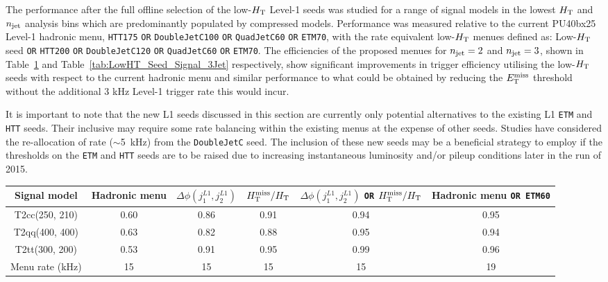 The performance after the full offline selection of the low-$\mbox{$H_\text{T}$}$ Level-1 seeds was studied for a range of signal models in the lowest $\mbox{$H_\text{T}$}$ and $n_{\text{jet}}$ analysis bins which are predominantly populated by compressed models. Performance was measured relative to the current PU40bx25 Level-1 hadronic menu, {\verb!HTT175! \verb!OR! \verb!DoubleJetC100! \verb!OR! \verb!QuadJetC60! \verb!OR! \verb!ETM70!}, with the rate equivalent low-$\mbox{$H_\text{T}$}$ menues defined as: Low-$\mbox{$H_\text{T}$}$ seed {\verb!OR! \verb!HTT200! \verb!OR! \verb!DoubleJetC120! \verb!OR! \verb!QuadJetC60! \verb!OR! \verb!ETM70!}. The efficiencies of the proposed menues for $n_{\text{jet}} = 2$ and $n_{\text{jet}} = 3$, shown in Table~\ref{tab:LowHT_Seed_Signal_2Jet} and Table~\ref{tab:LowHT_Seed_Signal_3Jet} respectively, show significant improvements in trigger efficiency utilising the low-$\mbox{$H_\text{T}$}$ seeds with respect to the current hadronic menu and similar performance to what could be obtained by reducing the $\mbox{$E_\text{T}^{\rm miss}$}$ threshold without the additional 3 kHz Level-1 trigger rate this would incur.

It is important to note that the new L1 seeds discussed in this
section are currently only potential alternatives to the existing L1
\texttt{ETM} and \texttt{HTT} seeds. Their inclusive may require some
rate balancing within the existing menus at the expense of other
seeds. Studies have considered the re-allocation of rate ($\sim$5~kHz)
from the \texttt{DoubleJetC} seed. The inclusion of these new seeds
may be a beneficial strategy to employ if the thresholds on the
\texttt{ETM} and \texttt{HTT} seeds are to be raised due to increasing
instantaneous luminosity and/or pileup conditions later in the run of
2015.

\begin{table}[h!]
\footnotesize
\centering
\begin{tabular}{cccccc} 
\hline
\hline
  Signal model & Hadronic menu & $\Delta\phi(j_{1}^{L1},j_{2}^{L1})$ & $\mbox{$H_{\rm T}^{\rm miss}$}/\mbox{$H_\text{T}$}$ &$\Delta\phi(j_{1}^{L1},j_{2}^{L1})$ \verb!OR! $\mbox{$H_{\rm T}^{\rm miss}$}/\mbox{$H_\text{T}$}$ & Hadronic menu \verb!OR ETM60! \\
\hline
  T2cc(250, 210)   & 0.60 & 0.86 & 0.91 & 0.94 & 0.95 \\
  T2qq(400, 400)   & 0.63 & 0.82 & 0.88 & 0.95 & 0.94 \\
  T2tt(300, 200)   & 0.53 & 0.91 & 0.95 & 0.99 & 0.96 \\
\hline
  Menu rate (kHz) & 15   & 15   & 15   & 15   & 19   \\
\hline
\hline
\end{tabular}
\label{tab:LowHT_Seed_Signal_2Jet}
\end{table}

